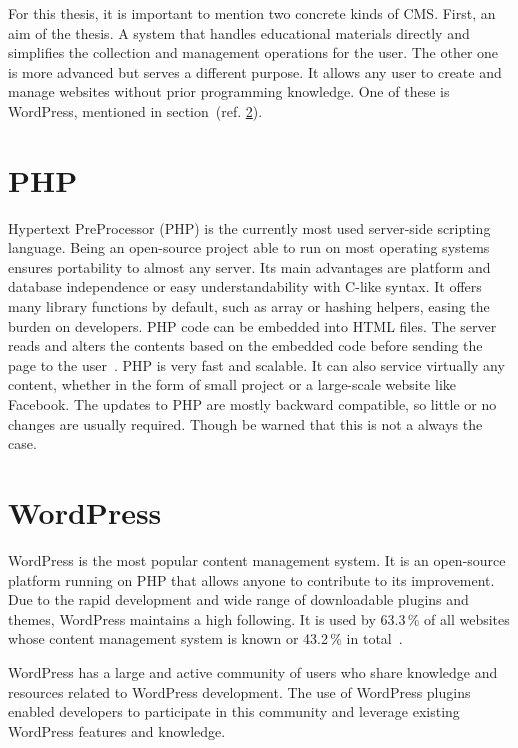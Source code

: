 \documentclass[
  digital,     %
  oneside,     %
  nosansbold,  %
  colorbold, %
  lof,         %
  lot,         %
]{fithesis4}
\newcommand{\cref}[1]{(ref. \ref{#1})}
\begin{document}
For this thesis, it is important to mention two concrete kinds of CMS. First, an aim
of the thesis. A system that handles educational materials directly and simplifies
the collection and management operations for the user. The other one is more advanced
but serves a different purpose. It allows any user to create and manage websites
without prior programming knowledge. One of these is WordPress, mentioned in
section~\cref{sect:wordpress}.

\section{PHP}

Hypertext PreProcessor (PHP) is the currently most used \mbox{server-side} scripting
language. Being an \mbox{open-source} project able to run on most operating systems
ensures portability to almost any server. Its main advantages are platform and database
independence or easy understandability with \mbox{C-like} syntax. It offers many
library functions by default, such as array or hashing helpers, easing the burden
on developers. PHP code can be embedded into HTML files. The server reads and
alters the contents based on the embedded code before sending the page to the
user~\parencite[page.~30]{welling17}. PHP is very fast and scalable. It can also service
virtually any content, whether in the form of small project or a \mbox{large-scale}
website like Facebook. The updates to PHP are mostly backward compatible, so little
or no changes are usually required. Though be warned that this is not a always the case.

\section{WordPress}
\label{sect:wordpress}

WordPress is the most popular content management system. It is an \mbox{open-source}
platform running on PHP that allows anyone to contribute to its improvement.
Due to the rapid development and wide range of downloadable plugins and themes,
WordPress maintains a high following. It is used by 63.3\,\% of all websites whose
content management system is known or 43.2\,\% in total~\cite{w3_wordpress}.

WordPress has a large and active community of users who share knowledge and
resources related to WordPress development. The use of WordPress plugins
enabled developers to participate in this community and leverage existing
WordPress features and knowledge.
\end{document}
